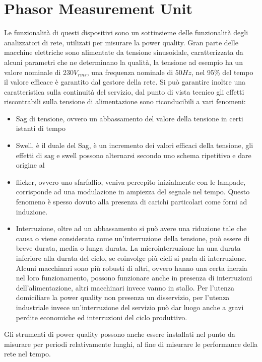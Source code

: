 
\section{Phasor Measurement Unit}
Le funzionalità di questi dispositivi sono un sottinsieme delle funzionalità
degli analizzatori di rete, utilizati per misurare la power quality.
Gran parte delle macchine elettriche sono alimentate da tensione sinusoidale,
caratterizzata da alcuni parametri che ne determinano la qualità, la tensione
ad esempio ha un valore nominale di 230$V_{rms}$, una frequenza nominale di $50
Hz$, nel 95\% del tempo il valore efficace è garantito dal gestore della rete.
Si può garantire inoltre una caratteristica sulla continuità del servizio, dal
punto di vista tecnico gli effetti riscontrabili sulla tensione di
alimentazione sono riconducibili a vari fenomeni:
\begin{itemize}
 \item Sag di tensione, ovvero un abbassamento del valore della tensione in
certi istanti di tempo
\item Swell, è il duale del Sag, è un incremento dei valori efficaci della
tensione, gli effetti di sag e swell possono alternarsi secondo uno schema
ripetitivo e dare origine al
\item flicker, ovvero uno sfarfallio, veniva percepito inizialmente con le
lampade, corrisponde ad una modulazione in ampiezza del segnale nel tempo.
Questo fenomeno è spesso dovuto alla presenza di carichi particolari come forni
ad induzione.
\item Interruzione, oltre ad un abbassamento si può avere una riduzione tale
che causa o viene considerata come un'interruzione della tensione, può essere
di breve durata, media o lunga durata.
La microinterruzione ha una durata inferiore alla durata del ciclo, se
coinvolge più cicli si parla di interruzione.
Alcuni macchinari sono più robusti di altri, ovvero hanno una certa inerzia nel
loro funzionamento, possono funzionare anche in presenza di interruzioni
dell'alimentazione, altri macchinari invece vanno in stallo.
Per l'utenza domiciliare la power quality non presenza un disservizio, per
l'utenza industriale invece un'interruzione del servizio può dar luogo anche a
gravi perdite economiche ed interruzioni del ciclo produttivo.
\end{itemize}

Gli strumenti di power quality possono anche essere installati nel punto da
misurare per periodi relativamente lunghi, al fine di misurare le performance
della rete nel tempo.

